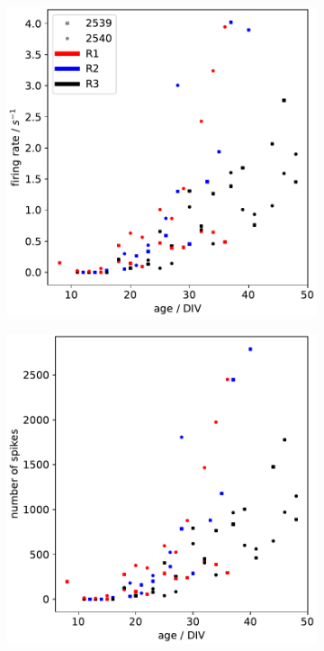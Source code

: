 \documentclass[10pt]{article}
\begin{document}
\begin{figure}
	\centering
\begin{subfigure}[b]{0.45\textwidth}
	\centering
	\includegraphics[width=\textwidth]{../plots/development_plots_fr.pdf}
\end{subfigure}
\hfill
\begin{subfigure}[b]{0.45\textwidth}
	\centering
	\includegraphics[width=\textwidth]{../plots/development_plots_n.pdf}
\end{subfigure}


\end{figure}
\end{document}
